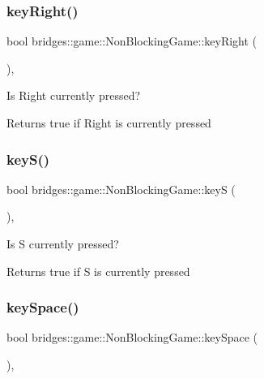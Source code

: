 \subsubsection{\texorpdfstring{keyRight()}{keyRight()}}
{\footnotesize\ttfamily bool bridges\+::game\+::\+Non\+Blocking\+Game\+::key\+Right (\begin{DoxyParamCaption}{ }\end{DoxyParamCaption})\hspace{0.3cm}{\ttfamily [inline]}, {\ttfamily [protected]}}



Is Right currently pressed? 

\begin{DoxyReturn}{Returns}
true if Right is currently pressed 
\end{DoxyReturn}
\mbox{\label{classbridges_1_1game_1_1_non_blocking_game_a75ece5d4fa35893ecacc82c5064c05e0}} 
\subsubsection{\texorpdfstring{keyS()}{keyS()}}
{\footnotesize\ttfamily bool bridges\+::game\+::\+Non\+Blocking\+Game\+::keyS (\begin{DoxyParamCaption}{ }\end{DoxyParamCaption})\hspace{0.3cm}{\ttfamily [inline]}, {\ttfamily [protected]}}



Is S currently pressed? 

\begin{DoxyReturn}{Returns}
true if S is currently pressed 
\end{DoxyReturn}
\mbox{\label{classbridges_1_1game_1_1_non_blocking_game_a54beca154b58b0e0fb26c75983ba5072}} 
\subsubsection{\texorpdfstring{keySpace()}{keySpace()}}
{\footnotesize\ttfamily bool bridges\+::game\+::\+Non\+Blocking\+Game\+::key\+Space (\begin{DoxyParamCaption}{ }\end{DoxyParamCaption})\hspace{0.3cm}{\ttfamily [inline]}, {\ttfamily [protected]}}




